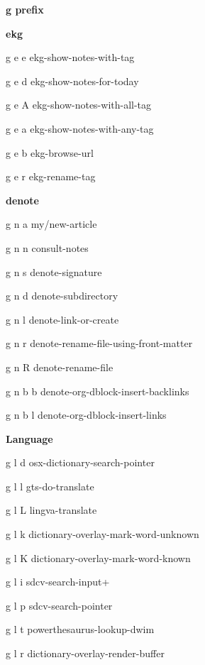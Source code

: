 \documentclass[10pt]{article}
\renewcommand\section[1]{\bigskip\par\textbf{\color{heading}\large#1}\smallskip}
\renewcommand\subsection[1]{\smallskip\par\textbf{\color{heading}#1}}
\begin{document}
\begin{multicols}{4}
  \section{g prefix}
  \subsection{ekg}
  \begin{keylist}
    \item[g e e] ekg-show-notes-with-tag
    \item[g e d] ekg-show-notes-for-today
    \item[g e A] ekg-show-notes-with-all-tag
    \item[g e a] ekg-show-notes-with-any-tag
    \item[g e b] ekg-browse-url
    \item[g e r] ekg-rename-tag
  \end{keylist}
  \subsection{denote}
  \begin{keylist}
    \item[g n a] my/new-article
    \item[g n n] consult-notes
    \item[g n s] denote-signature
    \item[g n d] denote-subdirectory
    \item[g n l] denote-link-or-create
    \item[g n r] denote-rename-file-using-front-matter
    \item[g n R] denote-rename-file
    \item[g n b b] denote-org-dblock-insert-backlinks
    \item[g n b l] denote-org-dblock-insert-links
  \end{keylist}

  \subsection{Language}
  \begin{keylist}
    \item[g l d] osx-dictionary-search-pointer
    \item[g l l] gts-do-translate
    \item[g l L] lingva-translate
    \item[g l k] dictionary-overlay-mark-word-unknown
    \item[g l K] dictionary-overlay-mark-word-known
    \item[g l i] sdcv-search-input+
    \item[g l p] sdcv-search-pointer
    \item[g l t] powerthesaurus-lookup-dwim
    \item[g l r] dictionary-overlay-render-buffer
  \end{keylist}

\end{multicols}
\end{document}
